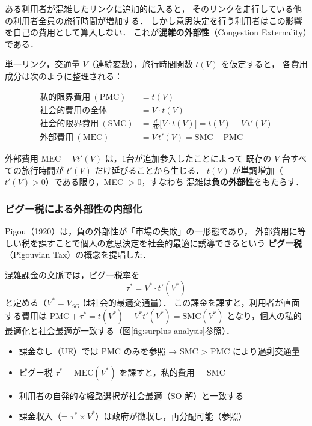 ある利用者が混雑したリンクに追加的に入ると，
そのリンクを走行している他の利用者全員の旅行時間が増加する．
しかし意思決定を行う利用者はこの影響を自己の費用として算入しない．
これが\textbf{混雑の外部性}（Congestion Externality）である\cite{Pigou1920}．

単一リンク，交通量 $V$（連続変数），旅行時間関数 $t(V)$ を仮定すると，
各費用成分は次のように整理される：

\begin{align}
  \text{私的限界費用}\ (\text{PMC}) &= t(V)
    \label{eq:pmc-def}\\
  \text{社会的費用の全体}            &= V \cdot t(V)
    \label{eq:social-cost}\\
  \text{社会的限界費用}\ (\text{SMC}) &= \frac{d}{dV}\bigl[V \cdot t(V)\bigr]
    = t(V) + V\, t'(V)
    \label{eq:smc-def}\\
  \text{外部費用}\ (\text{MEC}) &= V\, t'(V)
    = \text{SMC} - \text{PMC}
    \label{eq:mec-def}
\end{align}

外部費用 $\text{MEC} = V t'(V)$ は，1台が追加参入したことによって
既存の $V$ 台すべての旅行時間が $t'(V)$ だけ延びることから生じる．
$t(V)$ が単調増加（$t'(V) > 0$）である限り，MEC $> 0$，すなわち
混雑は\textbf{負の外部性}をもたらす．

\subsubsection*{ピグー税による外部性の内部化}

Pigou（1920）は，負の外部性が「市場の失敗」の一形態であり，
外部費用に等しい税を課すことで個人の意思決定を社会的最適に誘導できるという
\textbf{ピグー税}（Pigouvian Tax）の概念を提唱した\cite{Pigou1920}．

混雑課金の文脈では，ピグー税率を
\begin{equation}
  \tau^* = V^* \cdot t'(V^*)
  \label{eq:pigou-tax}
\end{equation}
と定める（$V^* = V_{SO}$ は社会的最適交通量）．
この課金を課すと，利用者が直面する費用は
$\text{PMC} + \tau^* = t(V^*) + V^* t'(V^*) = \text{SMC}(V^*)$
となり，個人の私的最適化と社会最適が一致する（図\ref{fig:surplus-analysis}参照）．

\begin{tcolorbox}[
  colback=orange!6!white, colframe=orange!60!black,
  title={\small ピグー税の要点},
  breakable, fonttitle=\bfseries\small
]
  \begin{itemize}\setlength{\itemsep}{2pt}
    \item 課金なし（UE）では PMC のみを参照 → SMC > PMC により過剰交通量
    \item ピグー税 $\tau^* = \text{MEC}(V^*)$ を課すと，私的費用 = SMC
    \item 利用者の自発的な経路選択が社会最適（SO 解）と一致する
    \item 課金収入（= $\tau^* \times V^*$）は政府が徴収し，再分配可能（参照）
  \end{itemize}
\end{tcolorbox}


